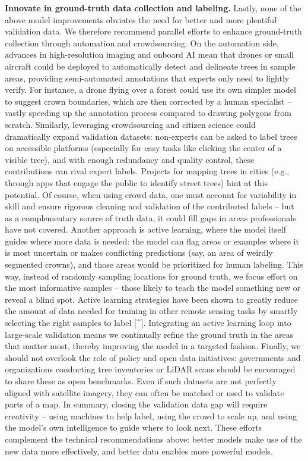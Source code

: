\documentclass[runningheads]{llncs}
\begin{document}
\textbf{Innovate in ground-truth data collection and labeling.} Lastly,
none of the above model improvements obviates the need for better and
more plentiful validation data. We therefore recommend parallel efforts
to enhance ground-truth collection through automation and crowdsourcing.
On the automation side, advances in high-resolution imaging and onboard
AI mean that drones or small aircraft could be deployed to automatically
detect and delineate trees in sample areas, providing semi-automated
annotations that experts only need to lightly verify. For instance, a
drone flying over a forest could use its own simpler model to suggest
crown boundaries, which are then corrected by a human specialist --
vastly speeding up the annotation process compared to drawing polygons
from scratch. Similarly, leveraging crowdsourcing and citizen science
could dramatically expand validation datasets: non-experts can be asked
to label trees on accessible platforms (especially for easy tasks like
clicking the center of a visible tree), and with enough redundancy and
quality control, these contributions can rival expert labels. Projects
for mapping trees in cities (e.g., through apps that engage the public
to identify street trees) hint at this potential. Of course, when using
crowd data, one must account for variability in skill and ensure
rigorous cleaning and validation of the contributed labels -- but as a
complementary source of truth data, it could fill gaps in areas
professionals have not covered. Another approach is active learning,
where the model itself guides where more data is needed: the model can
flag areas or examples where it is most uncertain or makes conflicting
predictions (say, an area of weirdly segmented crowns), and those areas
would be prioritized for human labeling. This way, instead of randomly
sampling locations for ground truth, we focus effort on the most
informative samples -- those likely to teach the model something new or
reveal a blind spot. Active learning strategies have been shown to
greatly reduce the amount of data needed for training in other remote
sensing tasks by smartly selecting the right samples to label
{[}\^{}{]}. Integrating an active learning loop into large-scale
validation means we continually refine the ground truth in the areas
that matter most, thereby improving the model in a targeted fashion.
Finally, we should not overlook the role of policy and open data
initiatives: governments and organizations conducting tree inventories
or LiDAR scans should be encouraged to share these as open benchmarks.
Even if such datasets are not perfectly aligned with satellite imagery,
they can often be matched or used to validate parts of a map. In
summary, closing the validation data gap will require creativity --
using machines to help label, using the crowd to scale up, and using the
model's own intelligence to guide where to look next. These efforts
complement the technical recommendations above: better models make use
of the new data more effectively, and better data enables more powerful
models.
\end{document}
